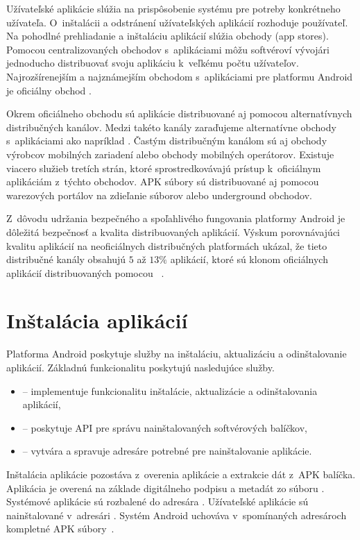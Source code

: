 Užívateľské aplikácie slúžia na prispôsobenie systému pre potreby konkrétneho užívateľa. O~inštalácii a odstránení užívateľských aplikácií rozhoduje používateľ. Na pohodlné prehliadanie a inštaláciu aplikácií slúžia obchody (app stores). Pomocou centralizovaných obchodov s~aplikáciami môžu softvéroví vývojári jednoducho distribuovať svoju aplikáciu k~veľkému počtu užívateľov.  Najrozšírenejším a najznámejším obchodom s~aplikáciami pre platformu Android je oficiálny obchod . 

Okrem oficiálneho obchodu sú aplikácie distribuované aj pomocou alternatívnych distribučných kanálov. Medzi takéto kanály zaraďujeme alternatívne obchody s~aplikáciami ako napríklad . Častým distribučným kanálom sú aj obchody výrobcov mobilných zariadení alebo obchody mobilných operátorov. Existuje viacero služieb tretích strán, ktoré sprostredkovávajú prístup k~oficiálnym aplikáciám z~týchto obchodov. APK súbory sú distribuované aj pomocou warezových portálov na zdieľanie súborov alebo underground obchodov. 

Z~dôvodu udržania bezpečného a spoľahlivého fungovania platformy Android je dôležitá bezpečnosť a kvalita distribuovaných aplikácií. Výskum porovnávajúci kvalitu aplikácií na neoficiálnych distribučných platformách ukázal, že tieto distribučné kanály obsahujú $5$ až $13\%$ aplikácií, ktoré sú klonom oficiálnych aplikácií distribuovaných pomocou ~\cite{Zhou2012}.

\section{Inštalácia aplikácií}

Platforma Android poskytuje služby na inštaláciu, aktualizáciu a odinštalovanie aplikácií. \newline
Základnú funkcionalitu poskytujú nasledujúce služby.
\begin{itemize}
	\item {} -- implementuje funkcionalitu inštalácie, aktualizácie a odinštalovania aplikácií,
	\item {} -- poskytuje API pre správu nainštalovaných softvérových balíčkov,
	\item {} -- vytvára a spravuje adresáre potrebné pre nainštalovanie aplikácie.
\end{itemize}
Inštalácia aplikácie pozostáva z~overenia aplikácie a extrakcie dát z~APK balíčka. Aplikácia je overená na základe digitálneho podpisu a metadát zo súboru . Systémové aplikácie sú rozbalené do adresára . Užívateľské aplikácie sú nainštalované v~adresári . Systém Android uchováva v~spomínaných adresároch kompletné APK súbory~\cite{AndroidDeveloper,Hashimi2009}.

